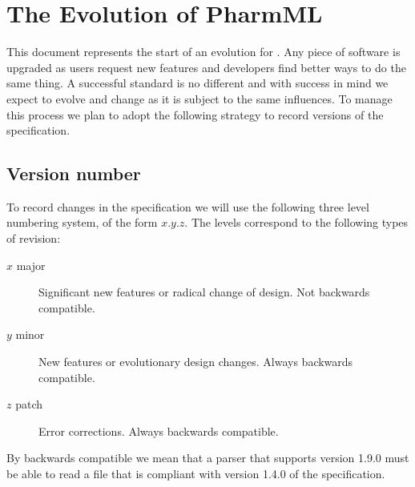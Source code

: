 

\section{The Evolution of PharmML}

This document represents the start of an evolution for \pharmml. Any piece of software is upgraded as
users request new features and developers find better ways to do the same thing. A successful standard
is no different and with success in mind we expect \pharmml to evolve and change as it is subject to the
same influences. To manage this process we plan to adopt the following strategy to record versions of
the \pharmml specification.

\subsection{Version number}
\label{intro:versioning}

To record changes in the specification we will use the following three level numbering system, of the form
$x.y.z$. The levels correspond to the following types of revision:

\begin{description}
\item[$x$ major] Significant new features or radical change of design. Not backwards compatible.
\item[$y$ minor] New features or evolutionary design changes. Always backwards compatible.
\item[$z$ patch] Error corrections. Always backwards compatible.
\end{description}

By backwards compatible we mean that a \pharmml parser that supports version 1.9.0 must be able to read
a file that is compliant with version 1.4.0 of the \pharmml specification.

